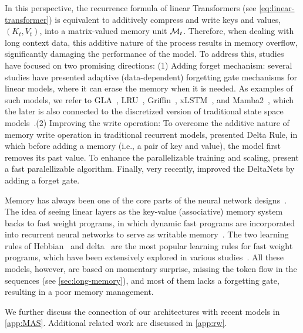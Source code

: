 In this perspective, the recurrence formula of linear Transformers (see \autoref{eq:linear-transformer}) is equivalent to additively compress and write keys and values, $(K_t, V_t)$, into a matrix-valued memory unit $\mathcal{M}_t$. Therefore, when dealing with long context data, this additive nature of the process results in memory overflow, significantly damaging the performance of the model. To address this, studies have focused on two promising directions: (1) Adding forget mechanism: several studies have presented adaptive (data-dependent) forgetting gate mechanisms for linear models, where it can erase the memory when it is needed. As examples of such models, we refer to GLA~\citep{yang2024gatedattn}, LRU~\citep{orvieto2023resurrecting}, Griffin~\citep{de2024griffin}, xLSTM~\citep{beck2024xlstm}, and Mamba2~\citep{dao2024transformers}, which the later is also connected to the discretized version of traditional state space models~\citep{gu2024mamba}.(2) Improving the write operation: To overcome the additive nature of memory write operation in traditional recurrent models, \citet{widrow1988adaptive} presented Delta Rule, in which before adding a memory (i.e., a pair of key and value), the model first removes its past value. To enhance the parallelizable training and scaling, \citet{yang2024parallelizing} present a fast paralellizable algorithm.  Finally, very recently, \citet{yang2024gated} improved the DeltaNets by adding a forget gate.   

 Memory has always been one of the core parts of the neural network designs~\citep{schmidhuber1992learning, LSTM, graves2014neuralturingmachines, zhang2024memory}. The idea of seeing linear layers as the key-value (associative) memory system backs to fast weight programs, in which dynamic fast programs are incorporated into recurrent neural networks to serve as writable memory~\citep{schmidhuber1992learning}. The two learning rules of Hebbian~\citep{hebb2005organization} and delta~\citep{prados1989neural} are the most popular learning rules for fast weight programs, which have been extensively explored in various studies~\citep{munkhdalai2017neural, schmidhuber1992learning, munkhdalai2019metalearned, schlag2021linear, irie2021going, yang2024parallelizing, yang2024gated}. All these models, however, are based on momentary surprise, missing the token flow in the sequences (see \autoref{sec:long-memory}), and most of them lacks a forgetting gate, resulting in a poor memory management. 
  

We further discuss the connection of our architectures with recent models in \autoref{app:MAS}. Additional related work are discussed in \autoref{app:rw}.

















